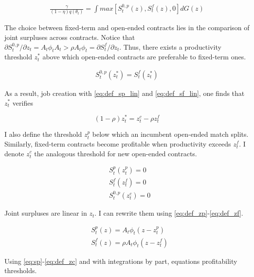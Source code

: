 \begin{align*}
\frac{\gamma}{(1-\eta) q\left( \theta_t \right)} = \int max \left[ S_t^{0,p} \left( z \right) , S_t^{f} \left( z \right), 0\right] dG(z)
\end{align*}

The choice between fixed-term and open-ended contracts lies in the comparison of joint surpluses across contracts. Notice that $\partial S_t^{0,p} / \partial z_t = A_t \phi_t A_t > \rho A_t \phi_t = \partial S_t^{f} / \partial z_t$. Thus, there exists a productivity threshold $z_t^*$ above which open-ended contracts are preferable to fixed-term ones.

\begin{align*}
S_t^{0,p} \left( z_t^* \right) = S_t^{f} \left( z_t^* \right) 
\end{align*}

As a result, job creation with \eqref{eq:def_sp_lin} and \eqref{eq:def_sf_lin}, one finds that $z_t^*$ verifies

\begin{equation}
(1-\rho) z_t^* = z_t^c - \rho z_t^f \label{eq:zs}
\end{equation}

I also define the threshold $z_t^p$ below which an incumbent open-ended match splits. Similarly, fixed-term contracts become profitable when productivity exceeds $z_t^f$. I denote $z_t^c$ the analogous threshold for new open-ended contracts.

\begin{align} \label{eq:def_zp}
&S_t^p \left( z_t^p \right) = 0 \\
\label{eq:def_zf}
&S_t^{f} \left( z_t^f \right) = 0\\ \label{eq:def_zc}
&S_t^{0,p} \left( z_t^c \right) = 0
\end{align}

Joint surpluses are linear in $z_t$. I can rewrite them using \eqref{eq:def_zp}-\eqref{eq:def_zf}. 

\begin{align}
&S_t^p (z) = A_t \phi_t \left( z - z_t^p \right) \label{eq:def_sp_lin} \\
&S_t^f (z) = \rho A_t \phi_t \left( z - z_t^f \right) \label{eq:def_sf_lin}
\end{align}

Using \eqref{eq:sp}-\eqref{eq:def_zc} and with integrations by part, equations profitability thresholds.

